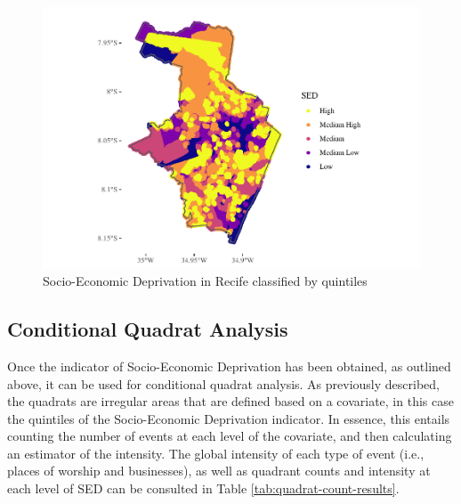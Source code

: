 \documentclass[smallextended]{svjour3}       %
\begin{document}
\begin{figure}
\centering
\includegraphics{Moral_Communities_and_Crime_files/figure-latex/plot-sed-as-quintiles-1.pdf}
\caption{\label{fig:plot-sed-as-quintiles}Socio-Economic Deprivation in
Recife classified by quintiles}
\end{figure}

\hypertarget{conditional-quadrat-analysis}{%
\subsection{Conditional Quadrat
Analysis}\label{conditional-quadrat-analysis}}

Once the indicator of Socio-Economic Deprivation has been obtained, as
outlined above, it can be used for conditional quadrat analysis. As
previously described, the quadrats are irregular areas that are defined
based on a covariate, in this case the quintiles of the Socio-Economic
Deprivation indicator. In essence, this entails counting the number of
events at each level of the covariate, and then calculating an estimator
of the intensity. The global intensity of each type of event (i.e.,
places of worship and businesses), as well as quadrant counts and
intensity at each level of SED can be consulted in Table
\ref{tab:quadrat-count-results}.
\end{document}
